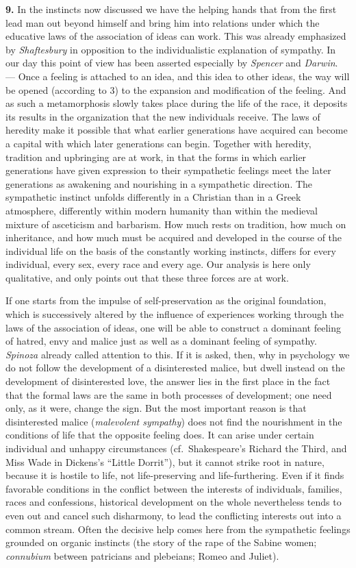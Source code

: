 \documentclass[12pt,a4paper]{book}
\newcommand{\opage}[1]{\marginnote{\footnotesize\textit{[#1]}}}
\begin{document}
\textbf{9.} In the instincts now discussed we have the helping hands
that from the first lead man out beyond himself and bring him into
relations under which the educative laws of the association of ideas can
work. This was already emphasized by \emph{Shaftesbury} in opposition to
the individualistic explanation of sympathy. In our day this point of
view has been asserted especially by \emph{Spencer} and \emph{Darwin}.
--- Once a feeling is attached to an idea, and this idea to other ideas,
the way will be opened (according to 3) to the expansion and
modification of the feeling. And as such a metamorphosis slowly takes
place during the life of the race, it deposits its results in the
organization that the new individuals receive. The laws of heredity make
it possible that what earlier generations have acquired can become a
capital with which later generations can begin. Together with heredity,
tradition and upbringing are at work, in that the forms in which earlier
generations have given expression to their sympathetic feelings meet the
later generations as awakening and nourishing in a sympathetic
direction. The sympathetic instinct unfolds differently in a Christian
than in a Greek atmosphere, differently within modern humanity than
within the medieval mixture of asceticism and barbarism. How much rests
on tradition, how much on inheritance, and how much must be acquired and
developed in the course of the individual life on the basis of the
constantly working instincts, differs for every individual, every sex,
every race and every age. Our analysis is here only qualitative, and
only points out that these three forces are at work.

If one starts from the impulse of self-preservation as the original
foundation, which is successively altered by the influence of
experiences working through the laws of the association of ideas, one
will be able to construct a dominant feeling of hatred,
\opage{303}envy and malice just as well as a dominant feeling of
sympathy. \emph{Spinoza} already called attention to this. If it is
asked, then, why in psychology we do not follow the development of a
disinterested malice, but dwell instead on the development of
disinterested love, the answer lies in the first place in the fact that
the formal laws are the same in both processes of development; one need
only, as it were, change the sign. But the most important reason is that
disinterested malice (\textit{malevolent sympathy}) does not find the
nourishment in the conditions of life that the opposite feeling does. It
can arise under certain individual and unhappy circumstances (cf.\
Shakespeare's Richard the Third, and Miss Wade in Dickens's ``Little
Dorrit''), but it cannot strike root in nature, because it is hostile to
life, not life-preserving and life-furthering. Even if it finds
favorable conditions in the conflict between the interests of
individuals, families, races and confessions, historical development on
the whole nevertheless tends to even out and cancel such disharmony, to
lead the conflicting interests out into a common stream. Often the
decisive help comes here from the sympathetic feelings grounded on
organic instincts (the story of the rape of the Sabine women;
\textit{connubium} between patricians and plebeians; Romeo and Juliet).
\end{document}
